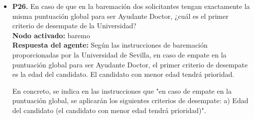 \documentclass{article}
\begin{document}
\begin{itemize}
      \item \textbf{P26.} En caso de que en la baremación dos solicitantes tengan exactamente la misma puntuación global para ser Ayudante Doctor, ¿cuál es el primer criterio de desempate de la Universidad? \\
            \textbf{Nodo activado:} baremo \\
            \textbf{Respuesta del agente:} Según las instrucciones de baremación proporcionadas por la Universidad de Sevilla, en caso de empate en la puntuación global para ser Ayudante Doctor, el primer criterio de desempate es la edad del candidato. El candidato con menor edad tendrá prioridad.

            En concreto, se indica en las instrucciones que "en caso de empate en la puntuación global, se aplicarán los siguientes criterios de desempate: a) Edad del candidato (el candidato con menor edad tendrá prioridad)".

\end{itemize}
\end{document}

